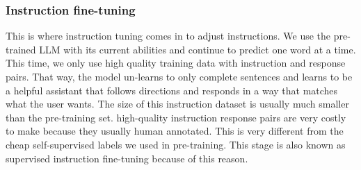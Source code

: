 \subsubsection{Instruction fine-tuning }
This is where instruction tuning comes in to adjust instructions. We use the pre-trained LLM with its current abilities and continue to predict one word at a time. This time, we only use high quality training data with instruction and response pairs.
\vskip 0.5cm
That way, the model un-learns to only complete sentences and learns to be a helpful assistant that follows directions and responds in a way that matches what the user wants. The size of this instruction dataset is usually much smaller than the pre-training set. high-quality instruction response pairs are very costly to make because they usually human annotated. This is very different from the cheap self-supervised labels we used in pre-training. This stage is also known as supervised instruction fine-tuning because of this reason.
